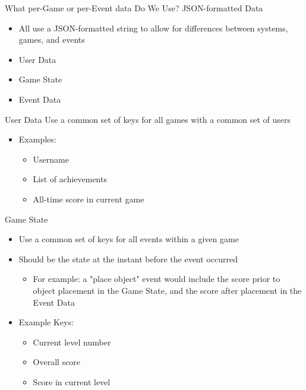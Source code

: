 \documentclass{beamer}
\begin{document}
\begin{frame}{What per-Game or per-Event data Do We Use?}
  JSON-formatted Data
  \begin{itemize}
    \item All use a JSON-formatted string to allow for differences between systems, games, and events
    \item \alert{User Data}
    \item \alert{Game State}
    \item \alert{Event Data}
  \end{itemize}
\end{frame}

\begin{frame}{User Data}
  Use a common set of keys for all games with a common set of users
  \begin{itemize}
    \item Examples:
    \begin{itemize}
      \item Username
      \item List of achievements
      \item All-time score in current game
    \end{itemize}
  \end{itemize}
\end{frame}

\begin{frame}{Game State}
  \begin{itemize}
    \item Use a common set of keys for all events within a given game
    \item Should be the state at the instant before the event occurred
    \begin{itemize}
      \item For example: a "place object" event would include the score prior to object placement in the Game State, and the score after placement in the Event Data
    \end{itemize}
    \item Example Keys:
    \begin{itemize}
      \item Current level number
      \item Overall score
      \item Score in current level
    \end{itemize}
  \end{itemize}
\end{frame}
\end{document}
